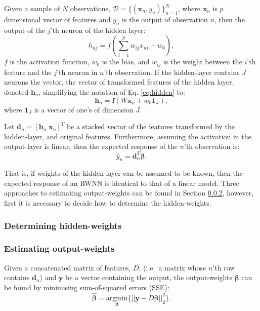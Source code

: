 \documentclass[
]{jss}
\begin{document}
Given a sample of \(N\) observations,
\(\mathcal D = \{(\boldsymbol x_n, y_n)\}_{n = 1}^N\), where
\(\boldsymbol x_n\) is \(p\) dimensional vector of features and \(y_n\)
is the output of observation \(n\), then the output of the \(j\)'th
neuron of the hidden layer: \begin{equation}
h_{nj} = f\left(\sum_{i = 1}^p w_{ij} x_{ni} + w_{0}\right), \label{eq:hidden}
\end{equation} \(f\) is the activation function, \(w_0\) is the bias,
and \(w_{ij}\) is the weight between the \(i\)'th feature and the
\(j\)'th neuron in \(n\)'th observation. If the hidden-layer contains
\(J\) neurons the vector, the vector of transformed features of the
hidden layer, denoted \(\boldsymbol h_{n}\), simplifying the notation of
Eq. \eqref{eq:hidden} to: \begin{equation}
\boldsymbol h_n = \boldsymbol f\left(W \boldsymbol{x}_n + w_0 \boldsymbol{1}_{J}\right),
\end{equation} where \(\boldsymbol{1}_{J}\) is a vector of one's of
dimension \(J\).

Let \(\boldsymbol d_n = [\boldsymbol h_n \; \boldsymbol x_n]^T\) be a
stacked vector of the features transformed by the hidden-layer, and
original features. Furthermore, assuming the activation in the
output-layer is linear, then the expected response of the \(n\)'th
observation is: \begin{equation}
\hat{y}_n = \boldsymbol d^T_n \boldsymbol \beta.
\end{equation}

That is, if weights of the hidden-layer can be assumed to be known, then
the expected response of an RWNN is identical to that of a linear model.
Three approaches to estimating output-weights can be found in Section
\ref{EST}, however, first it is necessary to decide how to determine the
hidden-weights.

\hypertarget{HST}{%
\subsubsection{Determining hidden-weights}\label{HST}}

\hypertarget{EST}{%
\subsubsection{Estimating output-weights}\label{EST}}

Given a concatenated matrix of features, \(D\), (i.e.~a matrix whose
\(n\)'th row contains \(\boldsymbol d_n\)) and \(\boldsymbol y\) be a
vector containing the output, the output-weights \(\boldsymbol \beta\)
can be found by minimising sum-of-squared errors (SSE): \begin{equation}
\hat{\boldsymbol{\beta}} = \underset{\boldsymbol{\beta}}{\text{argmin}} \Big\{ || \boldsymbol{y} - D\boldsymbol{\beta}||_2^2\Big\}. \label{eq:ssq}
\end{equation}
\end{document}
